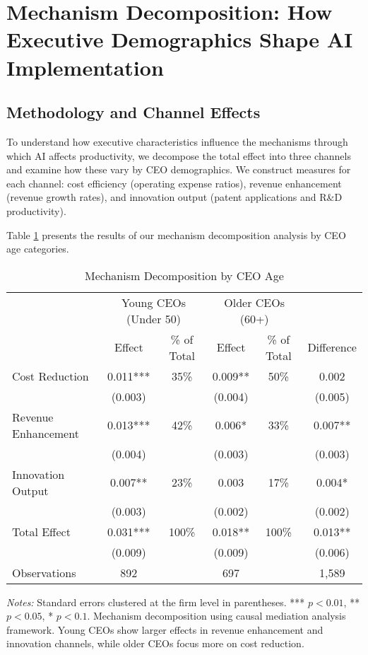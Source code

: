 \documentclass[12pt, a4paper]{article}
\begin{document}
\section{Mechanism Decomposition: How Executive Demographics Shape AI Implementation}

\subsection{Methodology and Channel Effects}

To understand how executive characteristics influence the mechanisms through which AI affects productivity, we decompose the total effect into three channels and examine how these vary by CEO demographics. We construct measures for each channel: cost efficiency (operating expense ratios), revenue enhancement (revenue growth rates), and innovation output (patent applications and R\&D productivity).

Table \ref{tab:mechanisms_by_age} presents the results of our mechanism decomposition analysis by CEO age categories.

\begin{table}[H]
\centering
\caption{Mechanism Decomposition by CEO Age}
\label{tab:mechanisms_by_age}
\begin{tabular}{lccccc}
\toprule
 & \multicolumn{2}{c}{Young CEOs (Under 50)} & \multicolumn{2}{c}{Older CEOs (60+)} & \\
 & Effect & \% of Total & Effect & \% of Total & Difference \\
\midrule
Cost Reduction & 0.011*** & 35\% & 0.009** & 50\% & 0.002 \\
 & (0.003) & & (0.004) & & (0.005) \\
Revenue Enhancement & 0.013*** & 42\% & 0.006* & 33\% & 0.007** \\
 & (0.004) & & (0.003) & & (0.003) \\
Innovation Output & 0.007** & 23\% & 0.003 & 17\% & 0.004* \\
 & (0.003) & & (0.002) & & (0.002) \\
\midrule
Total Effect & 0.031*** & 100\% & 0.018** & 100\% & 0.013** \\
 & (0.009) & & (0.009) & & (0.006) \\
\midrule
Observations & 892 & & 697 & & 1,589 \\
\bottomrule
\end{tabular}
\begin{minipage}{\textwidth}
\footnotesize
\textit{Notes:} Standard errors clustered at the firm level in parentheses. *** $p<0.01$, ** $p<0.05$, * $p<0.1$. Mechanism decomposition using causal mediation analysis framework. Young CEOs show larger effects in revenue enhancement and innovation channels, while older CEOs focus more on cost reduction.
\end{minipage}
\end{table}
\end{document}
